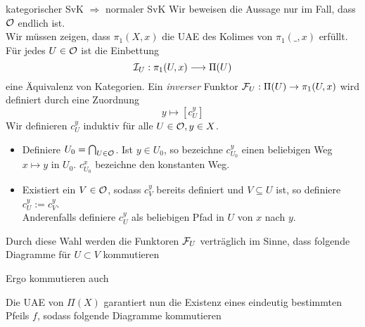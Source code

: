 \begin{Beweis}{kategorischer SvK $\Rightarrow$ normaler SvK}
Wir beweisen die Aussage nur im Fall, dass $\mathcal{O}$ endlich ist.\\
Wir müssen zeigen, dass $\pi_1(X,x)$ die UAE des Kolimes von $\pi_1(\_, x)$ erfüllt.\\
Für jedes $U \in \mathcal{O}$ ist die Einbettung
\[\mathcal{I}_U : \pi_1(U,x) \longrightarrow \Pi(U) \]
eine Äquivalenz von Kategorien. Ein \textsl{inverser} Funktor $\mathcal{F}_U : \Pi(U) \rightarrow \pi_1(U,x)$ wird definiert durch eine Zuordnung
\[y \longmapsto [c_U^y]\]
Wir definieren $c_U^y$ induktiv für alle $U \in \mathcal{O}, y \in X$.
\begin{itemize}
\item Definiere $U_0 = \bigcap_{U\in \mathcal{O}}$. Ist $y \in U_0$, so bezeichne $c_{U_0}^y$ einen beliebigen Weg $x \mapsto y$ in $U_0$. $c_{U_0}^x$ bezeichne den konstanten Weg.
\item Existiert ein $V \in \mathcal{O}$, sodass $c_V^y$ bereits definiert und $V \subseteq U$ ist, so definiere $c_U^y := c_V^y$.\\
Anderenfalls definiere $c_U^y$ als beliebigen Pfad in $U$ von $x$ nach $y$.
\end{itemize}
Durch diese Wahl werden die Funktoren $\mathcal{F}_U$ verträglich im Sinne, dass folgende Diagramme für $U \subset V$ kommutieren
\begin{center}
\end{center}
Ergo kommutieren auch
\begin{center}
\end{center}
Die UAE von $\Pi(X)$ garantiert nun die Existenz eines eindeutig bestimmten Pfeils $f$, sodass folgende Diagramme kommutieren
\begin{center}
\end{center}
\end{Beweis}
